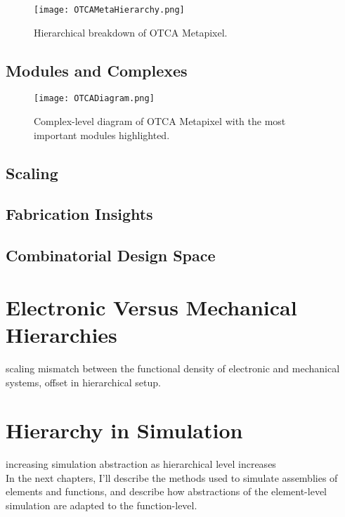 {\begin{sidewaysfigure}
  \texttt{[image: OTCAMetaHierarchy.png]}
  \caption{Hierarchical breakdown of OTCA Metapixel.}
  \label{fig:OTCAMetaHierarchy}
\end{sidewaysfigure}

\subsection{Modules and Complexes}

\begin{figure}
  \texttt{[image: OTCADiagram.png]}
  \caption{Complex-level diagram of OTCA Metapixel with the most important modules highlighted.}
  \label{fig:OTCADiagram}
\end{figure}

\subsection{Scaling}

\subsection{Fabrication Insights}

\subsection{Combinatorial Design Space}

\section{Electronic Versus Mechanical Hierarchies}

scaling mismatch between the functional density of electronic and mechanical systems, offset in hierarchical setup.

\section{Hierarchy in Simulation}

increasing simulation abstraction as hierarchical level increases\\

In the next chapters, I'll describe the methods used to simulate assemblies of elements and functions, and describe how abstractions of the element-level simulation are adapted to the function-level.



}
